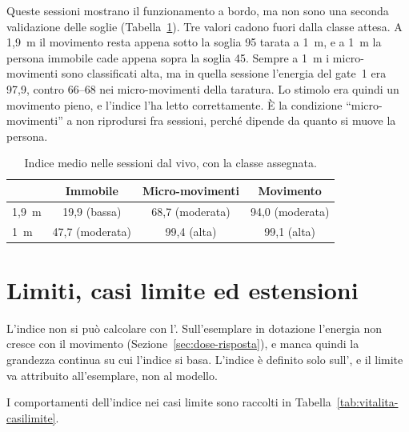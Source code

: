 Queste sessioni mostrano il funzionamento a bordo, ma non sono una seconda validazione delle soglie (Tabella~\ref{tab:vitalita-live}). Tre valori cadono fuori dalla classe attesa. A 1,9~m il movimento resta appena sotto la soglia 95 tarata a 1~m, e a 1~m la persona immobile cade appena sopra la soglia 45. Sempre a 1~m i micro-movimenti sono classificati alta, ma in quella sessione l'energia del gate~1 era 97,9, contro 66--68 nei micro-movimenti della taratura. Lo stimolo era quindi un movimento pieno, e l'indice l'ha letto correttamente. È la condizione ``micro-movimenti'' a non riprodursi fra sessioni, perché dipende da quanto si muove la persona.

\begin{table}[htbp]
\centering
\caption{Indice medio nelle sessioni dal vivo, con la classe assegnata.}
\label{tab:vitalita-live}
\small
\begin{tabular}{@{}lccc@{}}
\toprule
 & Immobile & Micro-movimenti & Movimento \\
\midrule
1,9~m & 19,9 (bassa) & 68,7 (moderata) & 94,0 (moderata) \\
1~m & 47,7 (moderata) & 99,4 (alta) & 99,1 (alta) \\
\bottomrule
\end{tabular}
\end{table}

\section{Limiti, casi limite ed estensioni}
\label{sec:vitalita-limiti}

L'indice non si può calcolare con l'\ldc. Sull'esemplare in dotazione l'energia non cresce con il movimento (Sezione~\ref{sec:dose-risposta}), e manca quindi la grandezza continua su cui l'indice si basa. L'indice è definito solo sull'\ldb, e il limite va attribuito all'esemplare, non al modello.

I comportamenti dell'indice nei casi limite
sono raccolti in Tabella~\ref{tab:vitalita-casilimite}.

